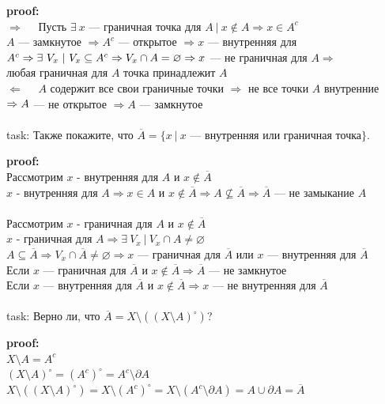 \documentclass[12pt]{article}
\begin{document}
\textbf{proof:}\\
$\Rightarrow\quad $
Пусть $\exists\ x$ --- граничная точка для $A\ |\ x \notin A \Rightarrow x \in A^c$\\
$A$ --- замкнутое $\Rightarrow A^c$ --- открытое $\Rightarrow x$ --- внутренняя для $A^c \Rightarrow\\
\exists\ V_x\ |\ V_x \subseteq A^c\Rightarrow V_x \cap A = \varnothing \Rightarrow x$ --- не граничная для $A \Rightarrow$\\
любая граничная для $A$ точка принадлежит $A$\\
$\Leftarrow\quad$
$A$ содержит все свои граничные точки $\Rightarrow$ не все точки $A$ внутренние $\Rightarrow\\
A$ --- не открытое $\Rightarrow A$ --- замкнутое\\ \\
task: Также покажите, что $\overline{A} = \{ x\ |\ x\text{ --- внутренняя или граничная точка}\}$.

\textbf{proof:}\\
Рассмотрим $x$ - внутренняя для $A$ и $x \notin \overline{A}$\\
$x$ - внутренняя для $A \Rightarrow x \in A$ и $x \notin \overline{A} \Rightarrow A \nsubseteq \overline{A} \Rightarrow \overline{A}$ --- не замыкание $A$\\ \\
Рассмотрим $x$ - граничная для $A$ и $x \notin \overline{A}$\\
$x$ - граничная для $A \Rightarrow \exists\ V_x\ |\ V_x \cap A \neq \varnothing$\\
$A \subseteq \overline{A} \Rightarrow V_x \cap \overline{A} \neq \varnothing \Rightarrow x$ --- граничная для $\overline{A}$ или $x$ --- внутренняя для $\overline{A}$\\
Если $x$ --- граничная для $\overline{A}$ и $x \notin \overline{A} \Rightarrow \overline{A}$ --- не замкнутое\\
Если $x$ --- внутренняя для $\overline{A}$ и $x \notin \overline{A} \Rightarrow x$ --- не внутренняя для $\overline{A}$\\\\
task: Верно ли, что $\overline{A} = X \setminus ((X\setminus A)^\circ)$?

\textbf{proof:}\\
$X \setminus A = A^c$\\
$(X\setminus A)^\circ = (A^c)^\circ = A^c \setminus \partial A$\\
$X \setminus ((X\setminus A)^\circ) = X \setminus (A^c)^\circ = X \setminus (A^c \setminus \partial A) = A \cup \partial A = \overline{A}$
\end{document}

